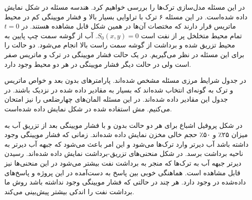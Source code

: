  در این مسئله مدل‌سازی ترک‌ها را بررسی خواهیم کرد. هندسه مسئله در شکل  نمایش داده ‌شده‌است. در این مسئله ۶ ترک با تراوایی بسیار بالا و فشار مویینگی کم در محیط ماتریس قرار دارند که مختصات آن‌ها در همین شکل قابل مشاهده هستند. در $t=0$ تمام محیط متخلخل پر از نفت است $S_0(x,y) = 0$. آب از گوشه سمت چپ پایین به محیط تزریق شده و برداشت از گوشه سمت راست بالا انجام می‌شود. دو حالت را برای این مسئله در نظر می‌گیریم. در یک حالت فشار مویینگی در ترک و ماتریس صفر است ولی در حالت دیگر فشار مویینگی در هر دو محیط وجود دارد.

در جدول  شرایط مرزی مسئله مشخص شده‌اند. پارامتر‌های بدون بعد و خواص ماتریس و ترک به گونه‌ای انتخاب شده‌اند که بسیار به مقادیر داده شده در  نزدیک باشند. در جدول  این مقادیر داده‌ شده‌اند. در این مسئله المان‌های چهارضلعی را نیز امتحان می‌کنیم. مش استفاده شده در شکل  نمایش داده شده‌است.

در شکل  پروفیل اشباع برای هر دو حالت بدون و با فشار مویینگی بعد از تزریق آب به میزان ۲۵٪ و ۵۰٪ حجم خالی مخزن نمایش داده شده‌اند. زمانی که فشار مویینگی وجود داشته باشد آب دیرتر وارد ترک‌ها می‌شود و این امر باعث می‌شود که جبهه آب دیرتر به ناحیه برداشت برسد. در شکل  منحنی‌های تزریق-برداشت نمایش داده شده‌اند. رسیدن دیرتر جبهه آب به ترک‌ها که منجر به برداشت نفت بیشتر می‌شود در این منحنی‌ها نیز قابل مشاهده است. هماهنگی خوبی بین پاسخ به دست‌آمده در این پروژه و پاسخ‌های داده‌شده در  وجود دارد. هر چند در حالتی که فشار مویینگی وجود نداشته باشد روش ما برداشت نفت را اندکی بیشتر پیش‌بینی می‌کند.


